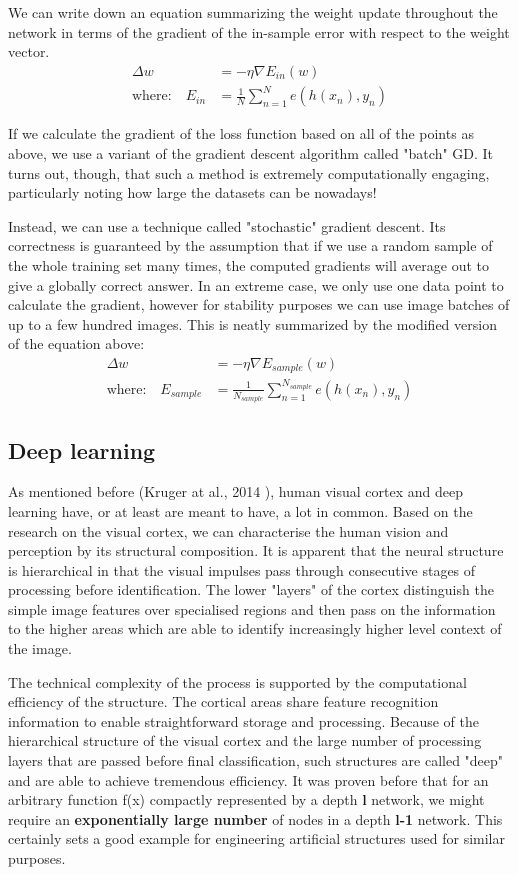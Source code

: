 \documentclass[a4paper, 12pt]{article}
\numberwithin{equation}{section}
\begin{document}
	We can write down an equation summarizing the weight update throughout the network in terms of the gradient of the in-sample error with respect to the weight vector.
	\begin{align}\label{weight_update}
	\Delta w &= - \eta \nabla E_{in}(w) \\
	\textrm{where:} \quad E_{in} &= \frac{1}{N} \sum_{n = 1}^{N} e(h(x_n), y_n)
	\end{align}

	If we calculate the gradient of the loss function based on all of the points as above, we use a variant of the gradient descent algorithm called "batch" GD. It turns out, though, that such a method is extremely computationally engaging, particularly noting how large the datasets can be nowadays!

	Instead, we can use a technique called "stochastic" gradient descent. Its correctness is guaranteed by the assumption that if we use a random sample of the whole training set many times, the computed gradients will average out to give a globally correct answer. In an extreme case, we only use one data point to calculate the gradient, however for stability purposes we can use image batches of up to a few hundred images. This is neatly summarized by the modified version of the equation above:
	\begin{align}
	\Delta w &= - \eta \nabla E_{sample}(w) \\
	\textrm{where:} \quad E_{sample} &= \frac{1}{N_{sample}} \sum_{n = 1}^{N_{sample}} e(h(x_n), y_n)
	\end{align}

	\subsection{Deep learning}

	As mentioned before (Kruger at al., 2014 \cite{kruger2013deep}), human visual cortex and deep learning have, or at least are meant to have, a lot in common. Based on the research on the visual cortex, we can characterise the human vision and perception by its structural composition. It is apparent that the neural structure is hierarchical in that the visual impulses pass through consecutive stages of processing before identification. The lower "layers" of the cortex distinguish the simple image features over specialised regions and then pass on the information to the higher areas which are able to identify increasingly higher level context of the image.

	The technical complexity of the process is supported by the computational efficiency of the structure. The cortical areas share feature recognition information to enable straightforward storage and processing. Because of the hierarchical structure of the visual cortex and the large number of processing layers that are passed before final classification, such structures are called "deep" and are able to achieve tremendous efficiency. It was proven before that for an arbitrary function f(x) compactly represented by a depth \textbf{l} network, we might require an \textbf{exponentially large number} of nodes in a depth \textbf{l-1} network. This certainly sets a good example for engineering artificial structures used for similar purposes.
\end{document}
